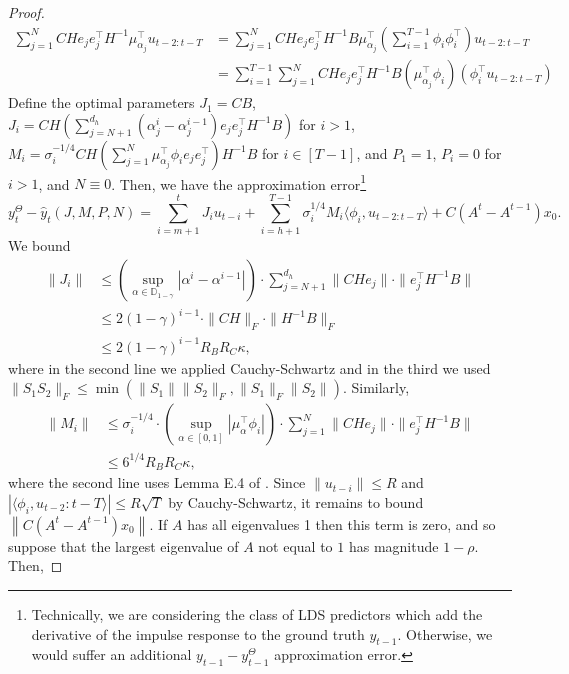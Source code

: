 \documentclass[11pt]{article}
\newcommand{\evannote}[1]{\textcolor{red}{\{evan: #1\}}}
\newcommand{\norm}[1]{\left\lVert#1\right\rVert}
\numberwithin{equation}{section}
\begin{document}
\begin{proof}
\begin{align*}
    \sum_{j=1}^{N} CHe_je_j^\top H^{-1} \mu_{\alpha_j}^\top u_{t-2:t-T} &=  \sum_{j=1}^{N} CHe_je_j^\top H^{-1} B\mu_{\alpha_j}^\top  \left(\sum_{i=1}^{T-1} \phi_i\phi_i^\top\right) u_{t-2:t-T}
    \\ &= \sum_{i=1}^{T-1}\sum_{j=1}^{N} CHe_je_j^\top H^{-1} B(\mu_{\alpha_j}^\top \phi_i) (\phi_i^\top u_{t-2:t-T})
\end{align*}
Define the optimal parameters $J_1 = CB$, $J_i = CH \left(\sum_{j=N+1}^{d_h} (\alpha_j^i - \alpha_j^{i-1}) e_je_j^\top H^{-1}B\right)$ for $i >1$, $M_i = \sigma_i^{-1/4} CH\left(\sum_{j=1}^N \mu_{\alpha_j}^\top \phi_i e_je_j^\top \right) H^{-1}B$ for $i \in [T-1]$, and $P_1 = 1$, $P_i = 0$ for $i >1$, and $N \equiv 0$. 
Then, we have the approximation error\footnote{Technically, we are considering the class of LDS predictors which add the derivative of the impulse response to the ground truth $y_{t-1}$. Otherwise, we would suffer an additional $y_{t-1} - y_{t-1}^\Theta$ approximation error.}
$$y^\Theta_t - \hat{y}_t(J, M, P, N) = \sum_{i=m+1}^t J_i u_{t-i} + \sum_{i=h+1}^{T-1} \sigma_i^{1/4}M_i \langle \phi_i, u_{t-2:t-T}\rangle + C(A^t - A^{t-1})x_0.$$
We bound
\begin{align*}\|J_i\| &\leq \left(\sup_{\alpha \in \mathbb{D}_{1-\gamma}} |\alpha^i - \alpha^{i-1}|\right) \cdot \sum_{j=N+1}^{d_h} \|CHe_j\| \cdot \|e_j^\top H^{-1}B\| \\&
\leq 2 (1-\gamma)^{i-1} \cdot \|CH\|_F \cdot \|H^{-1}B\|_F \\
&\leq 2(1-\gamma)^{i-1} R_B R_C \kappa,
\end{align*}
where in the second line we applied Cauchy-Schwartz and in the third we used $\|S_1S_2\|_F \leq \min(\|S_1\|\|S_2\|_F,\|S_1\|_F\|S_2\|)$. Similarly, 
\begin{align*}
    \|M_i\| &\leq \sigma_i^{-1/4} \cdot \left(\sup_{\alpha \in [0, 1]} |\mu_{\alpha}^\top \phi_i|\right) \cdot \sum_{j=1}^N \|CHe_j\| \cdot \|e_j^\top H^{-1}B\|\\
    &\leq 6^{1/4} R_BR_C\kappa,
\end{align*}
where the second line uses Lemma E.4 of \cite{hazan2017learning}. Since $\|u_{t-i}\| \leq R$ and $|\langle \phi_i, u_{t-2}:t-T\rangle| \leq R \sqrt{T}$ by Cauchy-Schwartz, it remains to bound $\norm{C(A^t - A^{t-1})x_0}$. If $A$ has all eigenvalues 1 then this term is zero, and so suppose that the largest eigenvalue of $A$ not equal to $1$ has magnitude $1-\rho$. Then,

\end{proof}
\end{document}
